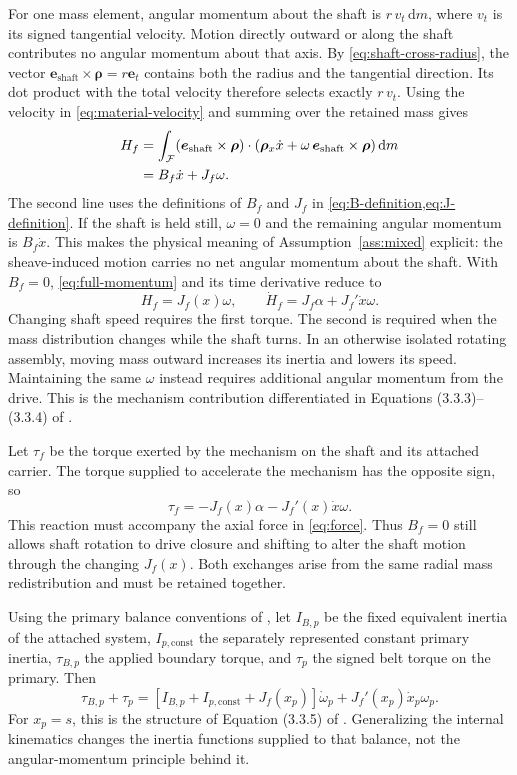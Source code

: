 \documentclass[11pt,letterpaper]{article}
\numberwithin{equation}{section}
\newcommand{\dd}{\mathrm{d}}
\newcommand{\e}{\bm e_{\mathrm{shaft}}}
\newcommand{\rhoo}{\bm\rho}
\newcommand{\source}{\cite{formulation}}
\begin{document}
For one mass element, angular momentum about the shaft is $r\,v_t\,\dd m$, where $v_t$ is its signed tangential velocity. Motion directly outward or along the shaft contributes no angular momentum about that axis. By \cref{eq:shaft-cross-radius}, the vector $\e\times\rhoo=r\bm e_t$ contains both the radius and the tangential direction. Its dot product with the total velocity therefore selects exactly $r\,v_t$. Using the velocity in \cref{eq:material-velocity} and summing over the retained mass gives
\begin{align}
  H_f
    &=\int_{\mathcal F}
       (\e\times\rhoo)\cdot
       \left(\rhoo_x\dot x+\omega\,\e\times\rhoo\right)\dd m
       \notag\\
    &=B_f\dot x+J_f\omega.
      \label{eq:full-momentum}
\end{align}
The second line uses the definitions of $B_f$ and $J_f$ in \cref{eq:B-definition,eq:J-definition}. If the shaft is held still, $\omega=0$ and the remaining angular momentum is $B_f\dot x$. This makes the physical meaning of Assumption~\ref{ass:mixed} explicit: the sheave-induced motion carries no net angular momentum about the shaft. With $B_f=0$, \cref{eq:full-momentum} and its time derivative reduce to
\begin{equation}
  H_f=J_f(x)\omega,
  \qquad
  \dot H_f=J_f\alpha+J_f'\dot x\omega.
  \label{eq:momentum}
\end{equation}
Changing shaft speed requires the first torque. The second is required when the mass distribution changes while the shaft turns. In an otherwise isolated rotating assembly, moving mass outward increases its inertia and lowers its speed. Maintaining the same $\omega$ instead requires additional angular momentum from the drive. This is the mechanism contribution differentiated in Equations (3.3.3)--(3.3.4) of \source.

Let $\tau_f$ be the torque exerted by the mechanism on the shaft and its attached carrier. The torque supplied to accelerate the mechanism has the opposite sign, so
\begin{equation}
  \boxed{\tau_f=-J_f(x)\alpha-J_f'(x)\dot x\omega.}
  \label{eq:torque}
\end{equation}
This reaction must accompany the axial force in \cref{eq:force}. Thus $B_f=0$ still allows shaft rotation to drive closure and shifting to alter the shaft motion through the changing $J_f(x)$. Both exchanges arise from the same radial mass redistribution and must be retained together.

Using the primary balance conventions of \source{}, let $I_{B,p}$ be the fixed equivalent inertia of the attached system, $I_{p,\mathrm{const}}$ the separately represented constant primary inertia, $\tau_{B,p}$ the applied boundary torque, and $\tau_p$ the signed belt torque on the primary. Then
\begin{equation}
  \tau_{B,p}+\tau_p
    =[I_{B,p}+I_{p,\mathrm{const}}+J_f(x_p)]\dot\omega_p
      +J_f'(x_p)\dot x_p\omega_p.
  \label{eq:completed-rotation}
\end{equation}
For $x_p=s$, this is the structure of Equation (3.3.5) of \source. Generalizing the internal kinematics changes the inertia functions supplied to that balance, not the angular-momentum principle behind it.
\end{document}
